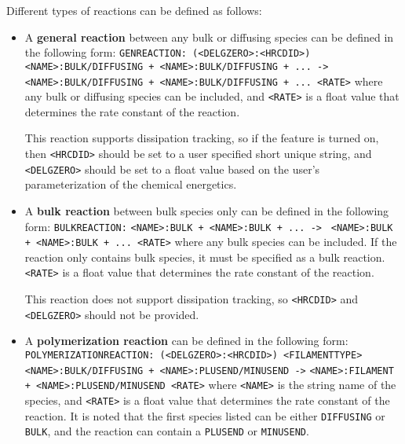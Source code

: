 \documentclass[11pt, oneside]{article}   	%
\begin{document}
\noindent Different types of reactions can be defined as follows:
\begin{itemize}
	
	
	\item A \textbf{general reaction} between any bulk or diffusing species can be defined in the following form: \newline\texttt{GENREACTION: (<DELGZERO>:<HRCDID>)}\newline 
	\texttt{<NAME>:BULK/DIFFUSING + <NAME>:BULK/DIFFUSING + ... ->}\newline
	\texttt{<NAME>:BULK/DIFFUSING + <NAME>:BULK/DIFFUSING + ... <RATE>}\newline\newline 
	where any bulk or diffusing species can be included, and \texttt{<RATE>} is a float value that determines the rate constant of the reaction.
	
	This reaction supports dissipation tracking, so if the feature is turned on, then \texttt{<HRCDID>} should be set to a user specified short unique string, and \texttt{<DELGZERO>} should be set to a float value based on the user's parameterization of the chemical energetics.  
	
	\item A \textbf{bulk reaction} between bulk species only can be defined in the following form: \newline\newline
	\texttt{BULKREACTION:}\newline
	\texttt{<NAME>:BULK + <NAME>:BULK + ... ->}\newline
	\texttt{ <NAME>:BULK + <NAME>:BULK + ... <RATE>}\newline\newline 
	where any bulk species can be included. If the reaction only contains bulk species, it must be specified as a bulk reaction. \texttt{<RATE>} is a float value that determines the rate constant  of the reaction.  
	
	This reaction does not support dissipation tracking, so \texttt{<HRCDID>} and \texttt{<DELGZERO>} should not be provided.  
	
	\item A \textbf{polymerization reaction} can be defined in the following form:\newline\newline
	\texttt{POLYMERIZATIONREACTION: (<DELGZERO>:<HRCDID>) <FILAMENTTYPE>}\newline
	\texttt{<NAME>:BULK/DIFFUSING + <NAME>:PLUSEND/MINUSEND ->}\newline
	\texttt{<NAME>:FILAMENT + <NAME>:PLUSEND/MINUSEND <RATE>}\newline\newline 
	where \texttt{<NAME>} is the string name of the species, and \texttt{<RATE>} is a float value that determines the rate constant  of the reaction. It is noted that the first species listed can be either \texttt{DIFFUSING} or \texttt{BULK}, and the reaction can contain a \texttt{PLUSEND} or \texttt{MINUSEND}.
	

\end{itemize}
\end{document}
